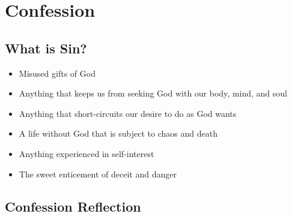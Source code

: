 \section{Confession}

\subsection{What is Sin?}

\begin{itemize} \setlength\itemsep{0pt}
\item Misused gifts of God
\item Anything that keeps us from seeking God with our body, mind, and soul
\item Anything that short-circuits our desire to do as God wants
\item A life without God that is subject to chaos and death
\item Anything experienced in self-interest
\item The sweet enticement of deceit and danger
\end{itemize}

\subsection{Confession Reflection}

